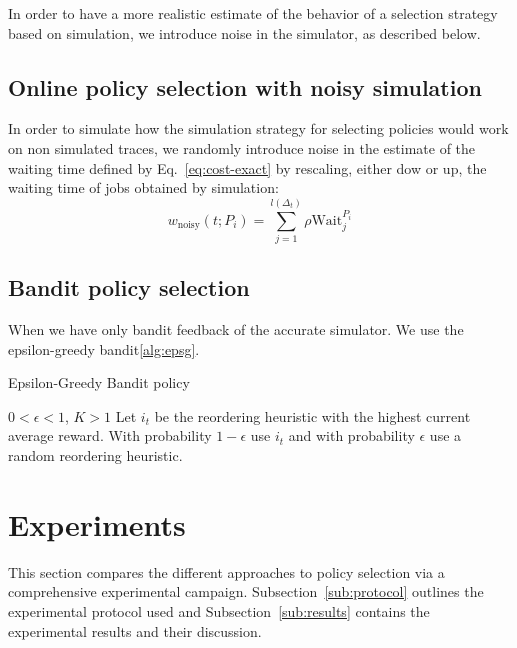 \documentclass[sigconf]{acmart}
\begin{document}
In order to have a more realistic estimate of the behavior of a selection strategy based on simulation, we introduce noise in the simulator, as described below.

\subsection{Online policy selection with noisy simulation}
\label{sub:noisy}

In order to simulate how the simulation strategy for selecting policies would work on non simulated traces, we randomly introduce noise in the estimate of the waiting time defined by Eq.~\ref{eq:cost-exact} by rescaling, either dow or up, the waiting time of jobs obtained by simulation:
%
\begin{equation}
\label{eq:cost-noisy}
w_{\mbox{noisy}}(t;P_i) = \sum_{j=1}^{l(\Delta_t)} \rho \mbox{Wait}_j^{P_i}
\end{equation}
%

\subsection{Bandit policy selection}
\label{sub:bandit}
When we have only bandit feedback of the accurate simulator.
We use the epsilon-greedy bandit\ref{alg:epsg}.

\begin{algorithm}[h]
  \caption{Epsilon-Greedy Bandit policy}
  \begin{algorithmic}[1]
    \renewcommand{\algorithmicrequire}{\textbf{Input:}}
    \renewcommand{\algorithmicensure}{\textbf{Output:}}
    \REQUIRE $0 < \epsilon < 1$, $K>1$
    \STATE Let $i_t$ be the reordering heuristic with the highest current
    average reward.
    \STATE With probability $1-\epsilon$ use $i_t$ and with probability
    $\epsilon$ use a random reordering heuristic.
    \ENDFOR
  \end{algorithmic}
  \label{alg:epsg}
\end{algorithm}



\section{Experiments}
\label{sec:experiments}

This section compares the different approaches to policy selection via a
comprehensive experimental campaign.  Subsection~\ref{sub:protocol} outlines
the experimental protocol used and Subsection~\ref{sub:results} contains the
experimental results and their discussion.
\end{document}
